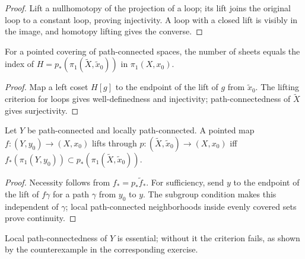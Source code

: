 \begin{proof}
\leanok
\sketch Lift a nullhomotopy of the projection of a loop; its lift joins the
original loop to a constant loop, proving injectivity. A loop with a closed
lift is visibly in the image, and homotopy lifting gives the converse.
\end{proof}

\begin{proposition}
\label{prop:covering-sheets-equals-index}
\leanok
{}
For a pointed covering of path-connected spaces, the number of sheets equals
the index of $H=p_*(\pi_1(\widetilde X,\widetilde x_0))$ in $\pi_1(X,x_0)$.
\end{proposition}

\begin{proof}
\leanok
\sketch Map a left coset $H[g]$ to the endpoint of the lift of $g$ from
$\widetilde x_0$. The lifting criterion for loops gives well-definedness and
injectivity; path-connectedness of $\widetilde X$ gives surjectivity.
\end{proof}

\begin{proposition}
\label{prop:covering-lifting-criterion}
\leanok
{}
Let $Y$ be path-connected and locally path-connected. A pointed map
$f:(Y,y_0)\to(X,x_0)$ lifts through
$p:(\widetilde X,\widetilde x_0)\to(X,x_0)$ iff
$f_*(\pi_1(Y,y_0))\subset p_*(\pi_1(\widetilde X,\widetilde x_0))$.
\end{proposition}

\begin{proof}
\leanok
\sketch Necessity follows from $f_*=p_*\widetilde f_*$. For sufficiency, send
$y$ to the endpoint of the lift of $f\gamma$ for a path $\gamma$ from $y_0$
to $y$. The subgroup condition makes this independent of $\gamma$; local
path-connected neighborhoods inside evenly covered sets prove continuity.
\end{proof}

Local path-connectedness of $Y$ is essential; without it the criterion fails,
as shown by the counterexample in the corresponding exercise.

